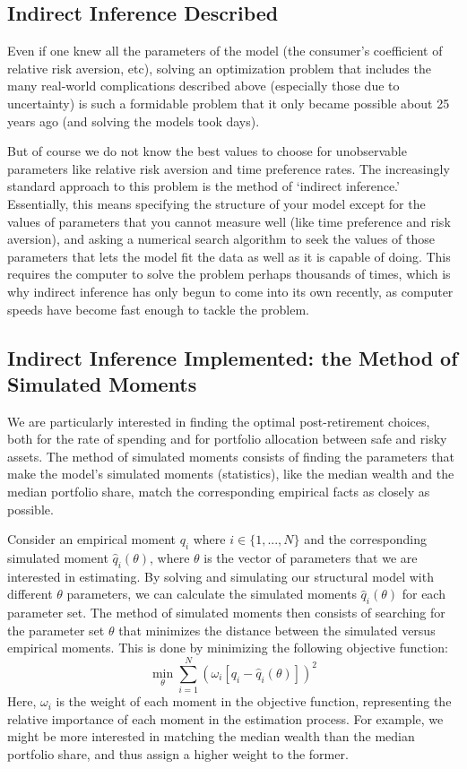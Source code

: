 \documentclass{article}
\begin{document}
\subsection{Indirect Inference Described}

Even if one knew all the parameters of the model (the consumer's coefficient of relative risk aversion, etc), solving an optimization problem that includes the many real-world complications described above (especially those due to uncertainty) is such a formidable problem that it only became possible about 25 years ago (and solving the models took days).

But of course we do not know the best values to choose for unobservable parameters like relative risk aversion and time preference rates.
The increasingly standard approach to this problem is the method of `indirect inference.'
Essentially, this means specifying the structure of your model except for the values of parameters that you cannot measure well (like time preference and risk aversion), and asking a numerical search algorithm to seek the values of those parameters that lets the model fit the data as well as it is capable of doing.
This requires the computer to solve the problem perhaps thousands of times, which is why indirect inference has only begun to come into its own recently, as computer speeds have become fast enough to tackle the problem.

\subsection{Indirect Inference Implemented: the Method of Simulated Moments}

We are particularly interested in finding the optimal post-retirement choices, both for the rate of spending and for portfolio allocation between safe and risky assets.
The method of simulated moments consists of finding the parameters that make the model's simulated moments (statistics), like the median wealth and the median portfolio share, match the corresponding empirical facts as closely as possible.

Consider an empirical moment $q_i$ where $i \in \{1,...,N\}$ and the corresponding simulated moment $\hat{q}_i(\theta)$, where $\theta$ is the vector of parameters that we are interested in estimating.
By solving and simulating our structural model with different $\theta$ parameters, we can calculate the simulated moments $\hat{q}_i(\theta)$ for each parameter set.
The method of simulated moments then consists of searching for the parameter set $\theta$ that minimizes the distance between the simulated versus empirical moments.
This is done by minimizing the following objective function:
\begin{equation}
\min_{\theta} \sum_{i=1}^{N}  \left( \omega_i [q_i - \hat{q}_i(\theta) ] \right)^2
\end{equation}
Here, $\omega_i$ is the weight of each moment in the objective function, representing the relative importance of each moment in the estimation process.
For example, we might be more interested in matching the median wealth than the median portfolio share, and thus assign a higher weight to the former.
\end{document}
